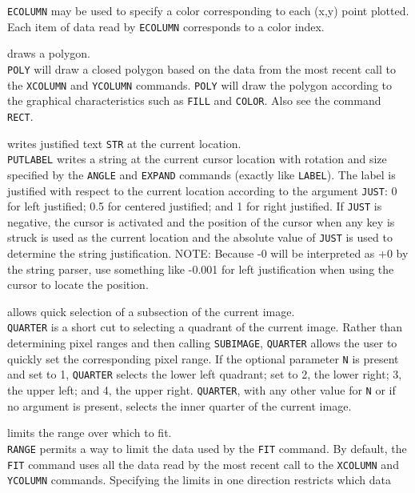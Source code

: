 	{\tt ECOLUMN} may be used to specify a
	color corresponding to each (x,y) point plotted.  Each item of
	data read by {\tt ECOLUMN} corresponds
	to a color index.
\item [{\tt POLY } --] draws a polygon.\\
	{\tt POLY} will draw a closed polygon based on the data
	from the most recent call to the
	{\tt XCOLUMN} and
	{\tt YCOLUMN} commands.
	{\tt POLY} will draw the polygon according to the
	graphical characteristics such as
	{\tt FILL} and
	{\tt COLOR}.
	Also see the command {\tt RECT}.
\item [{\tt PUTLABEL just str } --] writes justified text {\tt STR} at the current location.\\
	{\tt PUTLABEL} writes a string at the current cursor
	location with rotation and size specified by the
	{\tt ANGLE} and
	{\tt EXPAND} commands
	(exactly like {\tt LABEL}).
	The label is justified with respect to the current
	location according to the argument {\tt JUST}: 0 for left
	justified; 0.5 for centered justified; and 1 for right justified.
	If {\tt JUST} is negative, the cursor is activated and the
	position of the cursor when any key is struck is used as the
	current location and the absolute value of {\tt JUST} is
	used to determine the string justification.
	NOTE: Because -0 will be interpreted as +0 by the
	string parser, use something like -0.001 for left justification
	when using the cursor to locate the position.
\item [{\tt QUARTER [N] } --] allows quick selection of a subsection of the current image.\\
	{\tt QUARTER} is a short cut to selecting a quadrant of
	the current image.  Rather than determining pixel ranges and
	then calling {\tt SUBIMAGE},
	{\tt QUARTER} allows the user to quickly set the
	corresponding pixel range.  If the optional parameter {\tt N}
	is present and set to 1, {\tt QUARTER} selects the lower
	left quadrant; set to 2, the lower right; 3, the upper left;
	and 4, the upper right.  {\tt QUARTER}, with any other
	value for {\tt N} or if no argument is present, selects
	the inner quarter of the current image.
\item [{\tt RANGE [X1 X2 Y1 Y2] } --] limits the range over which to fit.\\
	{\tt RANGE} permits a way to limit the data used by the
	{\tt FIT} command.  By default, the
	{\tt FIT} command uses all the data read by the most
	recent call to the {\tt XCOLUMN}
	and {\tt YCOLUMN} commands.
	Specifying the limits in one direction restricts which data
